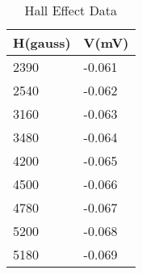 \begin{table}[]
	\centering
	\begin{tabular}{|l|l|}
	\hline
		H(gauss) & V(mV) \\ \hline
		2390 & -0.061 \\ \hline
		2540 & -0.062 \\ \hline
		3160 & -0.063 \\ \hline
		3480 & -0.064 \\ \hline
		4200 & -0.065 \\ \hline
		4500 & -0.066 \\ \hline
		4780 & -0.067 \\ \hline
		5200 & -0.068 \\ \hline
		5180 & -0.069 \\ \hline
	\end{tabular}
	\caption{Hall Effect Data}
	\label{tab:hall1}
\end{table}